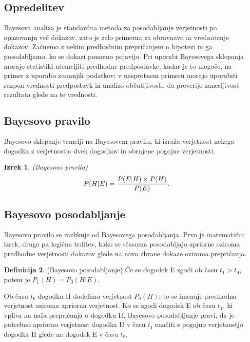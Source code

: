\documentclass[12pt,a4paper]{amsart}
\theoremstyle{definition} %
\newtheorem{definicija}{Definicija}[section]
\theoremstyle{plain} %
\newtheorem{izrek}[definicija]{Izrek}
\begin{document}
\subsection{Opredelitev}
Bayesova analiza je standardna metoda za posodabljanje verjetnosti po opazovanju več dokazov, zato je zelo primerna za obravnavo in vrednotenje 
dokazov.
Začnemo z nekim predhodnim prepričanjem o hipotezi in ga posodabljamo, ko se dokazi ponovno pojavijo. Pri uporabi Bayesovega sklepanja morajo statistiki utemeljiti predhodne predpostavke, kadar je to mogoče, na primer z
uporabo zunanjih podatkov; v nasprotnem primeru morajo uporabiti razpon vrednosti predpostavk in analizo občutljivosti, da preverijo zanesljivost rezultata
glede na te vrednosti.

\subsection{Bayesovo pravilo}
Bayesovo sklepanje temelji na Bayesovem pravilu, ki izraža verjetnost nekega dogodka z verjetnostjo dveh dogodkov in obrnjene pogojne
verjetnosti.
\begin{izrek}
    (Bayesovo pravilo)
    \begin{equation}\label{eq:bpravilo}
        P(H \lvert E) = \frac{P(E \lvert H) \times P(H)}{P(E)}. \vspace{2mm}
     \end{equation}
\end{izrek}

\subsection{Bayesovo posodabljanje}
Bayesovo pravilo se razlikuje od Bayesovega posodabljanja. Prvo je matematični izrek, drugo pa logična trditev, kako se sčasoma posodabljajo
apriorne oziroma predhodne verjetnosti dokazov glede na novo zbrane dokaze oziroma prepričanja.
\begin{definicija}
    (Bayesovo posodabljanje)
    Če se dogodek E zgodi ob času $t_1 > t_0$, potem je $P_1(H) = P_0(H \lvert E)$.
\end{definicija}
Ob času $t_0$ dogodku H dodelimo verjetnost $P_0(H)$; to se imenuje predhodna verjetnost oziroma apriorna verjetnost. Ko se zgodi dogodek E
ob času $t_1$, ki vpliva na naša prepričanja o dogodku H, Bayesovo posodabljanje pravi, da je potrebno apriorno verjetnost dogodka H v času $t_1$
enačiti s pogojno verjetnostjo dogodka H glede na dogodek E v času $t_0$. \\
\end{document}
